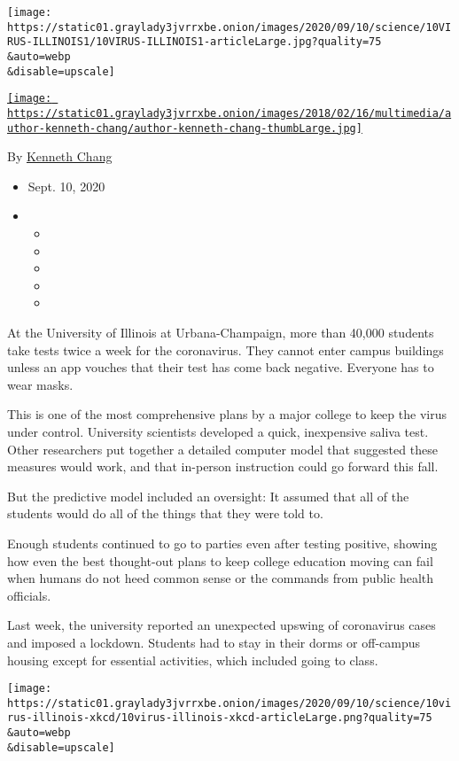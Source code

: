 \texttt{[image: https://static01.graylady3jvrrxbe.onion/images/2020/09/10/science/10VIRUS-ILLINOIS1/10VIRUS-ILLINOIS1-articleLarge.jpg?quality=75\\\&auto=webp\\\&disable=upscale]}

\href{https://www.nytimes3xbfgragh.onion/by/kenneth-chang}{\texttt{[image: https://static01.graylady3jvrrxbe.onion/images/2018/02/16/multimedia/author-kenneth-chang/author-kenneth-chang-thumbLarge.jpg]}}

By \href{https://www.nytimes3xbfgragh.onion/by/kenneth-chang}{Kenneth
Chang}

\begin{itemize}
\item
  Sept. 10, 2020
\item
  \begin{itemize}
  \item
  \item
  \item
  \item
  \item
  \end{itemize}
\end{itemize}

At the University of Illinois at Urbana-Champaign, more than 40,000
students take tests twice a week for the coronavirus. They cannot enter
campus buildings unless an app vouches that their test has come back
negative. Everyone has to wear masks.

This is one of the most comprehensive plans by a major college to keep
the virus under control. University scientists developed a quick,
inexpensive saliva test. Other researchers put together a detailed
computer model that suggested these measures would work, and that
in-person instruction could go forward this fall.

But the predictive model included an oversight: It assumed that all of
the students would do all of the things that they were told to.

Enough students continued to go to parties even after testing positive,
showing how even the best thought-out plans to keep college education
moving can fail when humans do not heed common sense or the commands
from public health officials.

Last week, the university reported an unexpected upswing of coronavirus
cases and imposed a lockdown. Students had to stay in their dorms or
off-campus housing except for essential activities, which included going
to class.

\texttt{[image: https://static01.graylady3jvrrxbe.onion/images/2020/09/10/science/10virus-illinois-xkcd/10virus-illinois-xkcd-articleLarge.png?quality=75\\\&auto=webp\\\&disable=upscale]}


